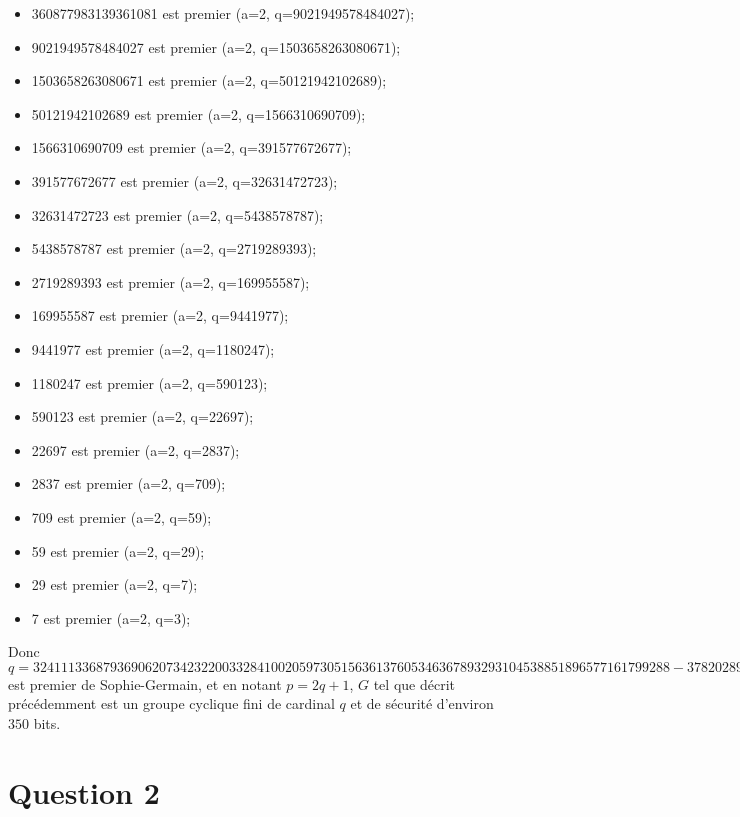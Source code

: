 \documentclass{article}
\begin{document}
\begin{itemize}
\item 360877983139361081 est premier (a=2, q=9021949578484027);
\item 9021949578484027 est premier (a=2, q=1503658263080671);
\item 1503658263080671 est premier (a=2, q=50121942102689);
\item 50121942102689 est premier (a=2, q=1566310690709);
\item 1566310690709 est premier (a=2, q=391577672677);
\item 391577672677 est premier (a=2, q=32631472723);
\item 32631472723 est premier (a=2, q=5438578787);
\item 5438578787 est premier (a=2, q=2719289393);
\item 2719289393 est premier (a=2, q=169955587);
\item 169955587 est premier (a=2, q=9441977);
\item 9441977 est premier (a=2, q=1180247);
\item 1180247 est premier (a=2, q=590123);
\item 590123 est premier (a=2, q=22697);
\item 22697 est premier (a=2, q=2837);
\item 2837 est premier (a=2, q=709);
\item 709 est premier (a=2, q=59);
\item 59 est premier (a=2, q=29);
\item 29 est premier (a=2, q=7);
\item 7 est premier (a=2, q=3);
\end{itemize}

Donc $q = 3241113368793690620734232200332841002059730515636137605346367893293104538851896577161799288- 378202895650629$ est premier de Sophie-Germain, et en notant $p = 2q+1$, $G$ tel que décrit précédemment est un groupe cyclique fini de cardinal $q$ et de sécurité d'environ $350$ bits.

\newpage
\section{Question 2}
\end{document}
